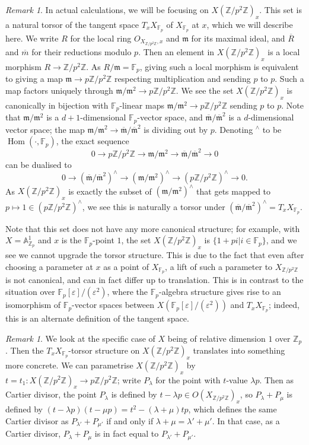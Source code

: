 \documentclass[12pt]{article}
\newcommand{\A}{\mathbb{A}}
\newcommand{\Z}{\mathbb{Z}}
\newcommand{\F}{\mathbb{F}}
\newcommand{\m}{\mathfrak{m}}
\DeclareMathOperator{\Hom}{Hom}
\theoremstyle{plain}
\theoremstyle{definition}
\theoremstyle{remark}
\newtheorem{rem}[thm]{Remark} %
\begin{document}
\begin{rem}
\label{rem:torsortangentspace}
In actual calculations, we will be focusing on $X(\Z/p^2\Z)_x$. This set is a natural torsor of the tangent space $T_x X_{\F_p}$ of $X_{\F_p}$ at $x$, which we will describe here. We write $R$ for the local ring $O_{X_{\Z/p^2\Z},x}$ and $\m$ for its maximal ideal, and $\overline{R}$ and $\overline{m}$ for their reductions modulo $p$. Then an element in $X(\Z/p^2\Z)_x$ is a local morphism $R \to \Z/p^2\Z$. As $R/\m = \F_p$, giving such a local morphism is equivalent to giving a map $\m \to p\Z/p^2\Z$ respecting multiplication and sending $p$ to $p$. Such a map factors uniquely through $\m/\m^2 \to p\Z/p^2\Z$. We see the set $X(\Z/p^2\Z)_x$ is canonically in bijection with $\F_p$-linear maps $\m/\m^2 \to p\Z/p^2\Z$ sending $p$ to $p$. Note that $\m/\m^2$ is a $d+1$-dimensional $\F_p$-vector space, and $\overline{\m}/\overline{\m}^2$ is a $d$-dimensional vector space; the map $\m/\m^2 \to \overline{\m}/\overline{\m}^2$ is dividing out by $p$. Denoting ${}^\wedge$ to be $\Hom(\cdot,\F_p)$, the exact sequence
\[
0 \to p\Z/p^2\Z \to \m/\m^2 \to \overline{\m}/\overline{\m}^2 \to 0
\]
can be dualised to
\[
0 \to (\overline{\m}/\overline{\m}^2)^\wedge \to (\m/\m^2)^\wedge \to (p\Z/p^2\Z)^{\wedge} \to 0.
\]
As $X(\Z/p^2\Z)_x$ is exactly the subset of $(\m/\m^2)^\wedge$ that gets mapped to $p \mapsto 1 \in (p\Z/p^2\Z)^{\wedge}$, we see this is naturally a torsor under $(\overline{\m}/\overline{\m}^2)^\wedge = T_{x} X_{\F_p}$.

Note that this set does not have any more canonical structure; for example, with $X = \A^1_{\Z_p}$ and $x$ is the $\F_p$-point $1$, the set $X(\Z/p^2\Z)_x$ is $\{1 + pi | i \in \F_p\}$, and we see we cannot upgrade the torsor structure. This is due to the fact that even after choosing a parameter at $x$ as a point of $X_{\F_p}$, a lift of such a parameter to $X_{\Z/p^2\Z}$ is not canonical, and can in fact differ up to translation. This is in contrast to the situation over $\F_p[\varepsilon]/(\varepsilon^2)$, where the $\F_p$-algebra structure gives rise to an isomorphism of $\F_p$-vector spaces between $X(\F_p[\varepsilon]/(\varepsilon^2))$ and $T_x X_{\F_p}$; indeed, this is an alternate definition of the tangent space.
\end{rem}

\begin{rem}
\label{rem:cartierlinear}
We look at the specific case of $X$ being of relative dimension $1$ over $\Z_p$. Then the $T_x X_{\F_p}$-torsor structure on $X(\Z/p^2\Z)_x$ translates into something more concrete. We can parametrise $X(\Z/p^2\Z)_x$ by $t = t_1 : X(\Z/p^2\Z)_x \to p\Z/p^2\Z$; write $P_{\lambda}$ for the point with $t$-value $\lambda p$. Then as Cartier divisor, the point $P_{\lambda}$ is defined by $t - \lambda p \in O(X_{\Z/p^2\Z})_x$, so $P_{\lambda} + P_{\mu}$ is defined by $(t-\lambda p)(t-\mu p) = t^2 - (\lambda + \mu)tp$, which defines the same Cartier divisor as $P_{\lambda'} + P_{\mu'}$ if and only if $\lambda + \mu = \lambda' + \mu'$. In that case, as a Cartier divisor, $P_{\lambda} + P_{\mu}$ is in fact equal to $P_{\lambda'} + P_{\mu'}$.
\end{rem}
\end{document}
